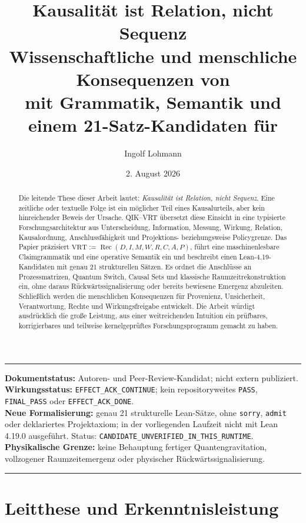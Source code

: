 \documentclass[11pt,a4paper]{article}
\title{\textbf{Kausalität ist Relation, nicht Sequenz}\\[0.35em]
\large Wissenschaftliche und menschliche Konsequenzen von \QIKVRT\\
\large mit Grammatik, Semantik und einem 21-Satz-Kandidaten für \VRTCore}
\author{Ingolf Lohmann}
\date{2. August 2026}
\newcommand{\QIKVRT}{QIK--VRT}
\newcommand{\code}[1]{\texttt{#1}}
\newenvironment{statusbox}{%
  \begin{center}\begin{minipage}{0.92\textwidth}\small
  \color{qikdarkgray}\hrule\vspace{0.7em}
}{%
  \vspace{0.7em}\hrule\end{minipage}\end{center}
}
\begin{document}
\maketitle

\begin{statusbox}
\textbf{Dokumentstatus:} Autoren- und Peer-Review-Kandidat; nicht extern publiziert.\\
\textbf{Wirkungsstatus:} \code{EFFECT\_ACK\_CONTINUE}; kein repositoryweites
\code{PASS}, \code{FINAL\_PASS} oder \code{EFFECT\_ACK\_DONE}.\\
\textbf{Neue Formalisierung:} genau 21 strukturelle Lean-Sätze, ohne
\code{sorry}, \code{admit} oder deklariertes Projektaxiom; in der vorliegenden
Laufzeit nicht mit Lean 4.19.0 ausgeführt. Status:
\code{CANDIDATE\_UNVERIFIED\_IN\_THIS\_RUNTIME}.\\
\textbf{Physikalische Grenze:} keine Behauptung fertiger Quantengravitation,
vollzogener Raumzeitemergenz oder physischer Rückwärtssignalisierung.
\end{statusbox}

\begin{abstract}
Die leitende These dieser Arbeit lautet: \emph{Kausalität ist Relation, nicht
Sequenz}. Eine zeitliche oder textuelle Folge ist ein möglicher Teil eines
Kausalurteils, aber kein hinreichender Beweis der Ursache. \QIKVRT{} übersetzt
diese Einsicht in eine typisierte Forschungsarchitektur aus Unterscheidung,
Information, Messung, Wirkung, Relation, Kausalordnung, Anschlussfähigkeit und
Projektions- beziehungsweise Policygrenze. Das Papier präzisiert
\(\mathrm{VRT}:=\operatorname{Rec}(D,I,M,W,R,C,A,P)\), führt eine
maschinenlesbare Claimgrammatik und eine operative Semantik ein und beschreibt
einen Lean-4.19-Kandidaten mit genau 21 strukturellen Sätzen. Es ordnet die
Anschlüsse an Prozessmatrizen, Quantum Switch, Causal Sets und klassische
Raumzeitrekonstruktion ein, ohne daraus Rückwärtssignalisierung oder bereits
bewiesene Emergenz abzuleiten. Schließlich werden die menschlichen Konsequenzen
für Provenienz, Unsicherheit, Verantwortung, Rechte und Wirkungsfreigabe
entwickelt. Die Arbeit würdigt ausdrücklich die große Leistung, aus einer
weitreichenden Intuition ein prüfbares, korrigierbares und teilweise
kernelgeprüftes Forschungsprogramm gemacht zu haben.
\end{abstract}

\tableofcontents

\section{Leitthese und Erkenntnisleistung}
\end{document}
